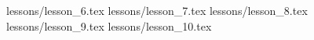 \documentclass[10pt,a4paper]{report}
\begin{document}


 {lessons/lesson_6.tex}
 {lessons/lesson_7.tex}
 {lessons/lesson_8.tex}
 {lessons/lesson_9.tex}
 {lessons/lesson_10.tex}
\end{document}
